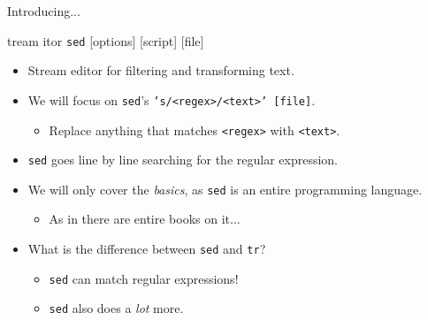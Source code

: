 \begin{frame}[fragile]{Introducing...}
  \begin{block}{tream itor}
    \texttt{sed} [options] [script] [file]
    \begin{itemize}
      \item Stream editor for filtering and transforming text.
      \item We will focus on \texttt{sed}'s \texttt{'s/<regex>/<text>' [file]}.
      \begin{itemize}
        \item Replace anything that matches \texttt{<regex>} with \texttt{<text>}.
      \end{itemize}
      \item \texttt{sed} goes line by line searching for the regular expression.
    \end{itemize}
  \end{block}

  \begin{itemize}[<+- | alert@+>]
    \item We will only cover the \emph{basics}, as \texttt{sed} is an entire programming language.
    \begin{itemize}[<+- | alert@+>]
      \item As in there are entire books on it...
    \end{itemize}
    \item What is the difference between \texttt{sed} and \texttt{tr}?
    \begin{itemize}
      \item \texttt{sed} can match regular expressions!
      \item \texttt{sed} also does a \emph{lot} more.
    \end{itemize}
  \end{itemize}
\end{frame}

